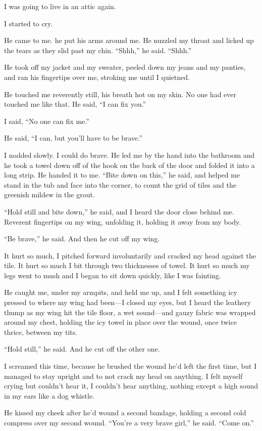 \documentclass{article}
\begin{document}
I was going to live in an attic again.

I started to cry.

He came to me.  he put his arms around me.  He nuzzled my throat and
licked up the tears as they slid past my chin.  ``Shhh,'' he said. 
``Shhh.''

He took off my jacket and my sweater, peeled down my jeans and my
panties, and ran his fingertips over me, stroking me until I quietned.

He touched me reverently still, his breath hot on my skin.  No one had
ever touched me like that.  He said, ``I can fix you.''

I said, ``No one can fix me.''

He said, ``I can, but you'll have to be brave.''

I nodded slowly.  I could do brave.  He led me by the hand into the
bathroom and he took a towel down off of the hook on the back of the
door and folded it into a long strip.  He handed it to me.  ``Bite
down on this,'' he said, and helped me stand in the tub and face into
the corner, to count the grid of tiles and the greenish mildew in the
grout.

``Hold still and bite down,'' he said, and I heard the door close
behind me.  Reverent fingertips on my wing, unfolding it, holding it
away from my body.

``Be brave,'' he said.  And then he cut off my wing.

It hurt so much, I pitched forward involuntarily and cracked my head
against the tile.  It hurt so much I bit through two thicknesses of
towel.  It hurt so much my legs went to mush and I began to sit down
quickly, like I was fainting.

He caught me, under my armpits, and held me up, and I felt something
icy pressed to where my wing had been---I closed my eyes, but I heard
the leathery thump as my wing hit the tile floor, a wet sound---and
gauzy fabric was wrapped around my chest, holding the icy towel in
place over the wound, once twice thrice, between my tits.

``Hold still,'' he said.  And he cut off the other one.

I screamed this time, because he brushed the wound he'd left the first
time, but I managed to stay upright and to not crack my head on
anything.  I felt myself crying but couldn't hear it, I couldn't hear
anything, nothing except a high sound in my ears like a dog whistle.

He kissed my cheek after he'd wound a second bandage, holding a second
cold compress over my second wound.  ``You're a very brave girl,'' he
said.  ``Come on.''
\end{document}
